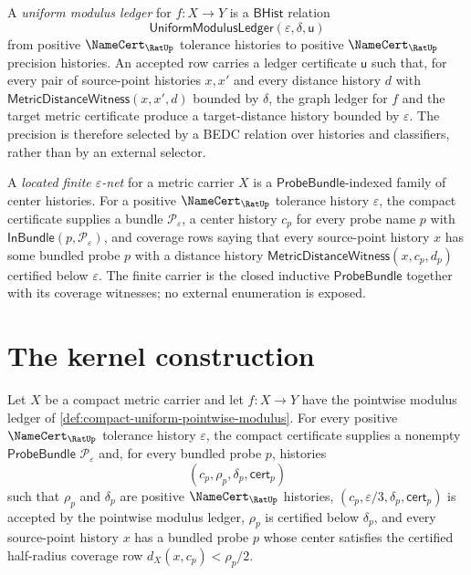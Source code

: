 \begin{definition}
\label{def:compact-uniform-uniform-modulus}
A \emph{uniform modulus ledger} for $f \colon X \to Y$ is a $\mathsf{BHist}$ relation
$$
\mathsf{UniformModulusLedger}(\varepsilon,\delta,\mathsf{u})
$$
from positive $\NameCert_{\RatUp}$ tolerance histories to positive $\NameCert_{\RatUp}$ precision histories. An accepted row carries a ledger certificate $\mathsf{u}$ such that, for every pair of source-point histories $x,x'$ and every distance history $d$ with $\mathsf{MetricDistanceWitness}(x,x',d)$ bounded by $\delta$, the graph ledger for $f$ and the target metric certificate produce a target-distance history bounded by $\varepsilon$. The precision is therefore selected by a BEDC relation over histories and classifiers, rather than by an external selector.
\end{definition}

\begin{definition}
\label{def:compact-uniform-finite-net}
A \emph{located finite $\varepsilon$-net} for a metric carrier $X$ is a $\mathsf{ProbeBundle}$-indexed family of center histories. For a positive $\NameCert_{\RatUp}$ tolerance history $\varepsilon$, the compact certificate supplies a bundle $\mathcal{P}_\varepsilon$, a center history $c_p$ for every probe name $p$ with $\mathsf{InBundle}(p,\mathcal{P}_\varepsilon)$, and coverage rows saying that every source-point history $x$ has some bundled probe $p$ with a distance history $\mathsf{MetricDistanceWitness}(x,c_p,d_p)$ certified below $\varepsilon$. The finite carrier is the closed inductive $\mathsf{ProbeBundle}$ together with its coverage witnesses; no external enumeration is exposed.
\end{definition}

\section{The kernel construction}
\label{sec:compact-uniform-continuity-construction}

\begin{lemma}
\label{lem:compact-uniform-subordinate-modulus-cover}
Let $X$ be a compact metric carrier and let $f \colon X \to Y$ have the pointwise modulus ledger of \autoref{def:compact-uniform-pointwise-modulus}. For every positive $\NameCert_{\RatUp}$ tolerance history $\varepsilon$, the compact certificate supplies a nonempty $\mathsf{ProbeBundle}$ $\mathcal{P}_\varepsilon$ and, for every bundled probe $p$, histories
$$
(c_p,\rho_p,\delta_p,\mathsf{cert}_p)
$$
such that $\rho_p$ and $\delta_p$ are positive $\NameCert_{\RatUp}$ histories, $(c_p,\varepsilon/3,\delta_p,\mathsf{cert}_p)$ is accepted by the pointwise modulus ledger, $\rho_p$ is certified below $\delta_p$, and every source-point history $x$ has a bundled probe $p$ whose center satisfies the certified half-radius coverage row $d_X(x,c_p)<\rho_p/2$.
\end{lemma}

